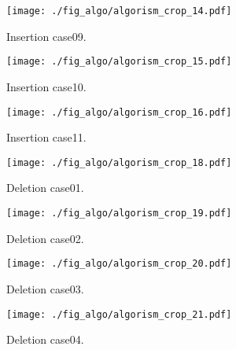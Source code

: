 \begin{figure}[h]
  \texttt{[image: ./fig\_algo/algorism\_crop\_14.pdf]}
  \caption{ Insertion case09. }
  \label{fig_IpCHashT_insert_hard_case09}

  \texttt{[image: ./fig\_algo/algorism\_crop\_15.pdf]}
  \caption{ Insertion case10. }
  \label{fig_IpCHashT_insert_hard_case10}

  \texttt{[image: ./fig\_algo/algorism\_crop\_16.pdf]}
  \caption{ Insertion case11. }
  \label{fig_IpCHashT_insert_hard_case11}
\end{figure}


\begin{figure}[h]
  \texttt{[image: ./fig\_algo/algorism\_crop\_18.pdf]}
  \caption{ Deletion case01. }
  \label{fig_IpCHashT_deletion_case01}

  \texttt{[image: ./fig\_algo/algorism\_crop\_19.pdf]}
  \caption{ Deletion case02. }
  \label{fig_IpCHashT_deletion_case02}

  \texttt{[image: ./fig\_algo/algorism\_crop\_20.pdf]}
  \caption{ Deletion case03. }
  \label{fig_IpCHashT_deletion_case03}

  \texttt{[image: ./fig\_algo/algorism\_crop\_21.pdf]}
  \caption{ Deletion case04. }
  \label{fig_IpCHashT_deletion_case04}
\end{figure}

